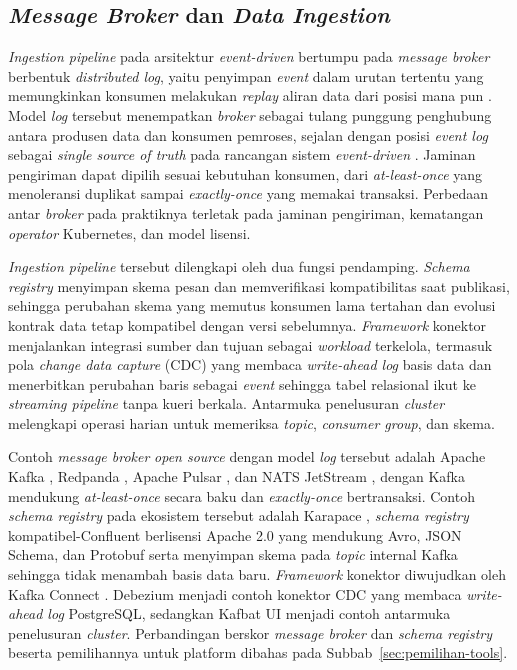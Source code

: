 \subsection{\textit{Message Broker} dan \textit{Data Ingestion}}
\label{subsec:kafka}

\textit{Ingestion pipeline} pada arsitektur \textit{event-driven} bertumpu pada \textit{message broker} berbentuk \textit{distributed log}, yaitu penyimpan \textit{event} dalam urutan tertentu yang memungkinkan konsumen melakukan \textit{replay} aliran data dari posisi mana pun \autocite{apachekafka2024}. Model \textit{log} tersebut menempatkan \textit{broker} sebagai tulang punggung penghubung antara produsen data dan konsumen pemroses, sejalan dengan posisi \textit{event log} sebagai \textit{single source of truth} pada rancangan sistem \textit{event-driven} \autocite{stopford2018designing}. Jaminan pengiriman dapat dipilih sesuai kebutuhan konsumen, dari \textit{at-least-once} yang menoleransi duplikat sampai \textit{exactly-once} yang memakai transaksi. Perbedaan antar \textit{broker} pada praktiknya terletak pada jaminan pengiriman, kematangan \textit{operator} Kubernetes, dan model lisensi.

\textit{Ingestion pipeline} tersebut dilengkapi oleh dua fungsi pendamping. \textit{Schema registry} menyimpan skema pesan dan memverifikasi kompatibilitas saat publikasi, sehingga perubahan skema yang memutus konsumen lama tertahan dan evolusi kontrak data tetap kompatibel dengan versi sebelumnya. \textit{Framework} konektor menjalankan integrasi sumber dan tujuan sebagai \textit{workload} terkelola, termasuk pola \textit{change data capture} (CDC) yang membaca \textit{write-ahead log} basis data dan menerbitkan perubahan baris sebagai \textit{event} sehingga tabel relasional ikut ke \textit{streaming pipeline} tanpa kueri berkala. Antarmuka penelusuran \textit{cluster} melengkapi operasi harian untuk memeriksa \textit{topic}, \textit{consumer group}, dan skema.

Contoh \textit{message broker} \textit{open source} dengan model \textit{log} tersebut adalah Apache Kafka \autocite{apachekafka2024}, Redpanda \autocite{redpanda2025}, Apache Pulsar \autocite{apachepulsar2025}, dan NATS JetStream \autocite{nats2025}, dengan Kafka mendukung \textit{at-least-once} secara baku dan \textit{exactly-once} bertransaksi. Contoh \textit{schema registry} pada ekosistem tersebut adalah Karapace \autocite{karapace2025}, \textit{schema registry} kompatibel-Confluent berlisensi Apache 2.0 yang mendukung Avro, JSON Schema, dan Protobuf serta menyimpan skema pada \textit{topic} internal Kafka sehingga tidak menambah basis data baru. \textit{Framework} konektor diwujudkan oleh Kafka Connect \autocite{apachekafka2024}. Debezium \autocite{debezium2025} menjadi contoh konektor CDC yang membaca \textit{write-ahead log} PostgreSQL, sedangkan Kafbat UI \autocite{kafbatui2025} menjadi contoh antarmuka penelusuran \textit{cluster}. Perbandingan berskor \textit{message broker} dan \textit{schema registry} beserta pemilihannya untuk platform dibahas pada Subbab~\ref{sec:pemilihan-tools}.


